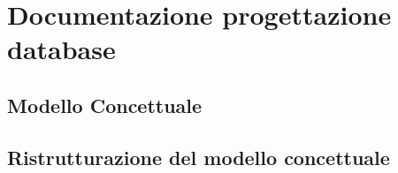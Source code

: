 \documentclass[paper=a4, fontsize=11pt]{scrartcl} %
\numberwithin{equation}{section} %
\numberwithin{figure}{section} %
\numberwithin{table}{section} %
\begin{document}
\newpage

\section{Documentazione progettazione database}
\subsection*{Modello Concettuale}



    \begin{figure}[htbp]
        \centering

        \qquad\qquad\qquad\qquad\qquad\qquad\qquad\qquad

        \qquad\qquad
      \end{figure}

\newpage
\subsection*{Ristrutturazione del modello concettuale}
\end{document}
